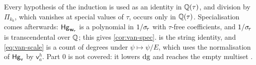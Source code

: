 Every hypothesis of the induction is used as an identity in $\mathbb{Q}(\tau)$, and division by $\Pi_{k_0}$, which vanishes at special values of $\tau$, occurs only in $\mathbb{Q}(\tau)$. Specialisation comes afterwards: $\mathsf{Hg}_{\mathbf{w}_{\!\tau}}$ is a polynomial in $1/\sigma_{\!\tau}$ with $\tau$-free coefficients, and $1/\sigma_{\!\tau}$ is transcendental over $\mathbb{Q}$; this gives \cref{cor:van-spec}.  is the string identity, and \eqref{eq:van-scale} is a count of degrees under $\psi\mapsto\psi/E$, which uses the normalisation of $\mathsf{Hg}_{\mathsf{v}}$ by $\mathsf{v}_a^h$. Part $0$ is not covered: it lowers $\mathrm{dg}$ and reaches the empty multiset .
